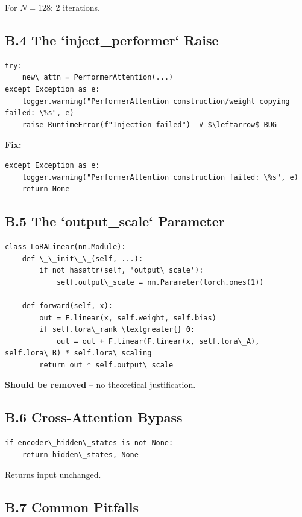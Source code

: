 For $N = 128$: 2 iterations.

\subsection{B.4 The `inject\_performer` Raise}

\begin{lstlisting}
try:
    new\_attn = PerformerAttention(...)
except Exception as e:
    logger.warning("PerformerAttention construction/weight copying failed: \%s", e)
    raise RuntimeError(f"Injection failed")  # $\leftarrow$ BUG
\end{lstlisting}

\textbf{Fix:}

\begin{lstlisting}
except Exception as e:
    logger.warning("PerformerAttention construction failed: \%s", e)
    return None
\end{lstlisting}

\subsection{B.5 The `output\_scale` Parameter}

\begin{lstlisting}
class LoRALinear(nn.Module):
    def \_\_init\_\_(self, ...):
        if not hasattr(self, 'output\_scale'):
            self.output\_scale = nn.Parameter(torch.ones(1))
    
    def forward(self, x):
        out = F.linear(x, self.weight, self.bias)
        if self.lora\_rank \textgreater{} 0:
            out = out + F.linear(F.linear(x, self.lora\_A), self.lora\_B) * self.lora\_scaling
        return out * self.output\_scale
\end{lstlisting}

\textbf{Should be removed} -- no theoretical justification.

\subsection{B.6 Cross-Attention Bypass}

\begin{lstlisting}
if encoder\_hidden\_states is not None:
    return hidden\_states, None
\end{lstlisting}

Returns input unchanged.

\subsection{B.7 Common Pitfalls}

